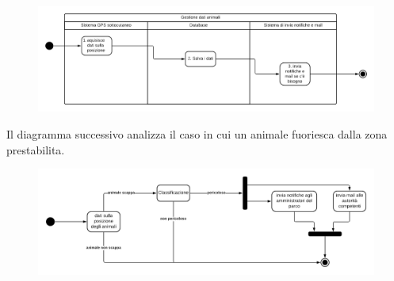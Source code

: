 \begin{figure}[ht]
    \centering
    \includegraphics[scale=0.25]{Img/swim_gestione_animali.png}
\end{figure}

Il diagramma successivo analizza il caso in cui un animale fuoriesca dalla zona prestabilita.

\begin{figure}[ht]
    \centering
    \includegraphics[scale=0.29]{Img/activity_animali.png}
\end{figure}